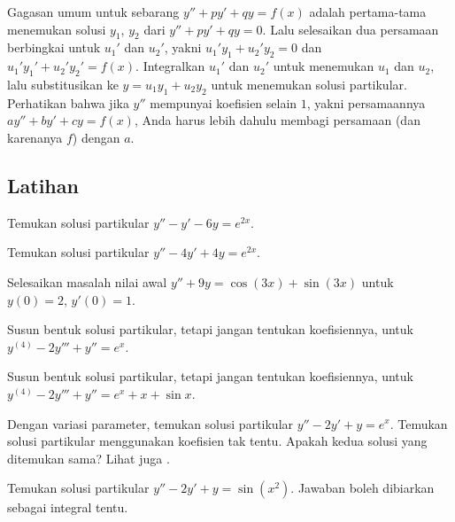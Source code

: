\medskip

Gagasan umum untuk sebarang $y'' + p y' + q y = f(x)$ adalah pertama-tama menemukan solusi $y_1$, $y_2$ dari $y''+py'+qy = 0$. Lalu selesaikan dua persamaan berbingkai untuk $u_1'$ dan $u_2'$, yakni $u_1' y_1 + u_2' y_2 = 0$ dan $u_1' y_1' + u_2' y_2' = f(x)$. Integralkan $u_1'$ dan $u_2'$ untuk menemukan $u_1$ dan $u_2$, lalu substitusikan ke $y = u_1 y_1 + u_2 y_2$ untuk menemukan solusi partikular. Perhatikan bahwa jika $y''$ mempunyai koefisien selain $1$, yakni persamaannya $ay'' + by' + cy = f(x)$, Anda harus lebih dahulu membagi persamaan (dan karenanya $f$) dengan $a$.

\subsection{Latihan}

\begin{exercise}
Temukan solusi partikular $y''-y' -6y = e^{2x}$.
\end{exercise}

\begin{exercise}
Temukan solusi partikular $y''-4y' +4y = e^{2x}$.
\end{exercise}

\begin{exercise}
Selesaikan masalah nilai awal $y''+9y = \cos (3x) + \sin (3x)$ untuk $y(0) = 2$, $y'(0) = 1$.
\end{exercise}

\begin{exercise}
Susun bentuk solusi partikular, tetapi jangan tentukan koefisiennya, untuk $y^{(4)}-2y'''+y'' = e^x$.
\end{exercise}

\begin{exercise}
Susun bentuk solusi partikular, tetapi jangan tentukan koefisiennya, untuk $y^{(4)}-2y'''+y'' = e^x + x + \sin x$.
\end{exercise}

\begin{exercise}
\pagebreak[2]
\leavevmode
\begin{tasks}
\task Dengan variasi parameter, temukan solusi partikular $y''-2y'+y = e^x$.
\task Temukan solusi partikular menggunakan koefisien tak tentu.
\task Apakah kedua solusi yang ditemukan sama? Lihat juga .
\end{tasks}
\end{exercise}

\begin{exercise}
Temukan solusi partikular $y''-2y' +y = \sin (x^2)$. Jawaban boleh dibiarkan sebagai integral tentu.
\end{exercise}

